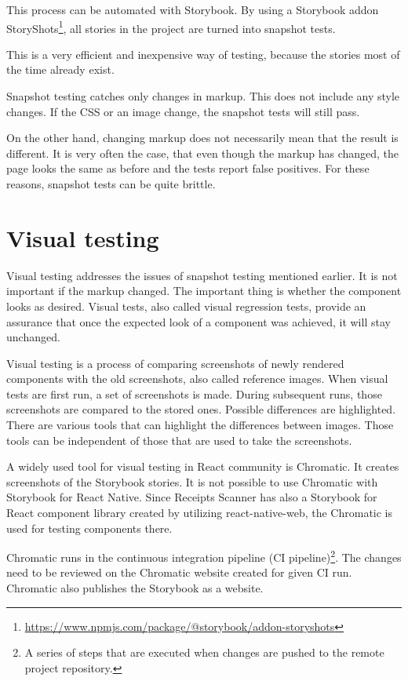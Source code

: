 \documentclass[
  digital, %
  table,   %
  oneside, %
  lof,     %
  lot,     %
]{fithesis3}
\begin{document}
This process can be automated with Storybook.
By using a Storybook addon StoryShots\footnote{\url{https://www.npmjs.com/package/@storybook/addon-storyshots}}, all stories in the project are turned into snapshot tests. 

This is a very efficient and inexpensive way of testing, because the stories most of the time already exist.

Snapshot testing catches only changes in markup. This does not include any style changes. If the CSS or an image change, the snapshot tests will still pass. 

On the other hand, changing markup does not necessarily mean that the result is different. It is very often the case, that even though the markup has changed, the page looks the same as before and the tests report false positives. For these reasons, snapshot tests can be quite brittle.

\section{Visual testing}
\label{sect:visual_testing}
Visual testing addresses the issues of snapshot testing mentioned earlier. It is not important if the markup changed. The important thing is whether the component looks as desired. Visual tests, also called visual regression tests, provide an assurance that once the expected look of a component was achieved, it will stay unchanged.

Visual testing is a process of comparing screenshots of newly rendered components with the old screenshots, also called reference images.
When visual tests are first run, a set of screenshots is made. During subsequent runs, those screenshots are compared to the stored ones. Possible differences are highlighted. There are various tools that can highlight the differences between images. Those tools can be independent of those that are used to take the screenshots.

A widely used tool for visual testing in React community is Chromatic. It creates screenshots of the Storybook stories. It is not possible to use Chromatic with Storybook for React Native. Since Receipts Scanner has also a Storybook for React component library created by utilizing react-native-web, the Chromatic is used for testing components there.

Chromatic runs in the continuous integration pipeline (CI pipeline)\footnote{A series of steps that are executed when changes are pushed to the remote project repository.}. The changes need to be reviewed on the Chromatic website created for given CI run. Chromatic also publishes the Storybook as a website.
\end{document}
